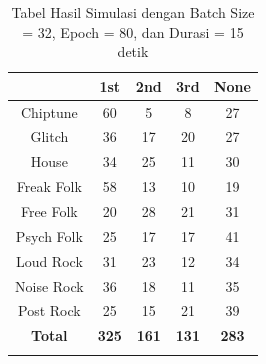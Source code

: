 \begin{longtable}[c]{|c|c|c|c|c|}
	\hline
	\textbf{}      & \textbf{1st} & \textbf{2nd} & \textbf{3rd} & \textbf{None} \\ \hline
	\endfirsthead
	\endhead
	Chiptune       & 60           & 5            & 8            & 27            \\ \hline
	Glitch         & 36           & 17           & 20           & 27            \\ \hline
	House          & 34           & 25           & 11           & 30            \\ \hline
	Freak Folk     & 58           & 13           & 10           & 19            \\ \hline
	Free Folk      & 20           & 28           & 21           & 31            \\ \hline
	Psych Folk     & 25           & 17           & 17           & 41            \\ \hline
	Loud Rock      & 31           & 23           & 12           & 34            \\ \hline
	Noise Rock     & 36           & 18           & 11           & 35            \\ \hline
	Post Rock      & 25           & 15           & 21           & 39            \\ \hline
	\textbf{Total} & \textbf{325} & \textbf{161} & \textbf{131} & \textbf{283}  \\ \hline
	\caption{Tabel Hasil Simulasi dengan Batch Size = 32, Epoch = 80, dan Durasi = 15 detik}
	\label{tab:my-table}\\
\end{longtable}

